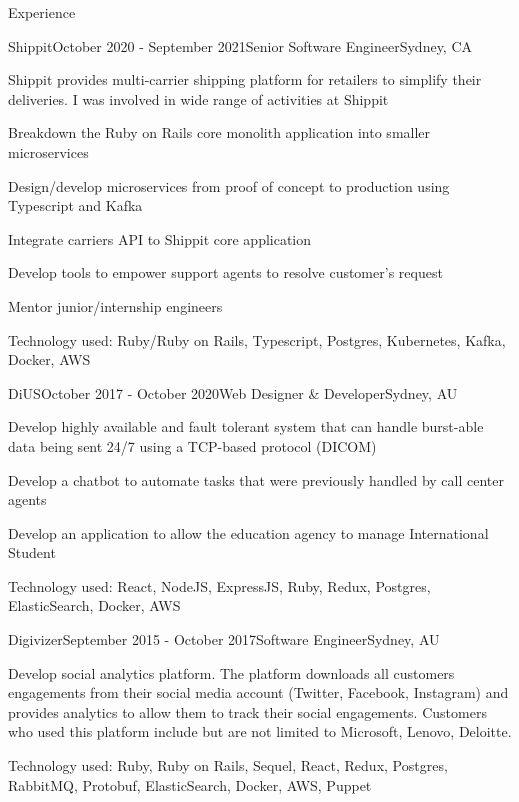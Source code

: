 \documentclass[
	11pt, %
]{banguyen-medium-length} %
\begin{document}
\begin{rSection}{Experience}
	\begin{rSubsection}{Shippit}{October 2020 - September 2021}{Senior Software
		Engineer}{Sydney, CA}
		\item Shippit provides multi-carrier shipping platform for retailers to
			simplify their deliveries.
			I was involved in wide range of activities at Shippit
		\item Breakdown the Ruby on Rails core monolith application into smaller microservices
		\item Design/develop microservices from proof of concept to production using
			Typescript and Kafka
		\item Integrate carriers API to Shippit core application
		\item Develop tools to empower support agents to resolve customer's request
		\item Mentor junior/internship engineers
		\item Technology used: Ruby/Ruby on Rails, Typescript, Postgres, Kubernetes, Kafka, Docker, AWS
	\end{rSubsection}


	\begin{rSubsection}{DiUS}{October 2017 - October 2020}{Web Designer \&
		Developer}{Sydney, AU}
		\item Develop highly available and fault tolerant system that can handle burst-able data being sent 24/7 using a TCP-based protocol (DICOM)
		\item Develop a chatbot to automate tasks that were previously handled by call center agents
		\item Develop an application to allow the education agency to manage International Student
		\item Technology used: React, NodeJS, ExpressJS, Ruby, Redux, Postgres, ElasticSearch, Docker, AWS
	\end{rSubsection}

	\begin{rSubsection}{Digivizer}{September 2015 - October 2017}{Software Engineer}{Sydney, AU}
		\item Develop social analytics platform. The platform downloads all customers engagements from their social
			media account (Twitter, Facebook, Instagram) and provides analytics to allow
			them to track their social engagements. Customers who used this platform
			include but are not limited to Microsoft, Lenovo, Deloitte.
		\item Technology used: Ruby, Ruby on Rails, Sequel, React, Redux, Postgres, RabbitMQ,
			Protobuf, ElasticSearch, Docker, AWS, Puppet
	\end{rSubsection}


\end{rSection}
\end{document}
